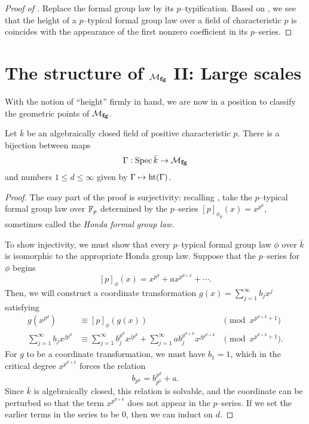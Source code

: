 \begin{proof}[{Proof of }]
Replace the formal group law by its $p$--typification.  Based on , we see that the height of a $p$--typical formal group law over a field of characteristic $p$ is coincides with the appearance of the first nonzero coefficient in its $p$--series.
\end{proof}


\section{The structure of $\mathcal{M}_{\mathbf{fg}}$ II: Large scales}

With the notion of ``height'' firmly in hand, we are now in a position to classify the geometric points of $\mathcal{M}_{\mathbf{fg}}$.

\begin{theorem}\label{FGpsOverAlgClosedFields}
Let $\bar k$ be an algebraically closed field of positive characteristic $p$.  There is a bijection between maps \[\Gamma: \operatorname{Spec} \bar k \to \mathcal{M}_{\mathbf{fg}}\] and numbers $1 \le d \le \infty$ given by $\Gamma \mapsto \operatorname{ht}(\Gamma)$. 
\end{theorem}
\begin{proof}
The easy part of the proof is surjectivity: recalling , take the $p$--typical formal group law over $\mathbb F_p$ determined by the $p$--series $[p]_{\phi_d}(x) = x^{p^d}$, sometimes called the \textit{Honda formal group law}.

To show injectivity, we must show that every $p$--typical formal group law $\phi$ over $\bar k$ is isomorphic to the appropriate Honda group law.  Suppose that the $p$--series for $\phi$ begins \[[p]_\phi(x) = x^{p^d} + a x^{p^{d+k}} + \cdots. \]  Then, we will construct a coordinate transformation $g(x) = \sum_{j=1}^\infty b_j x^j$ satisfying
\begin{align*}
g(x^{p^d}) & \equiv [p]_\phi(g(x)) & \pmod{x^{p^{d+k} + 1}} \\
\sum_{j=1}^\infty b_j x^{jp^d} & \equiv \sum_{j=1}^\infty b_j^{p^d} x^{jp^d} + \sum_{j=1}^\infty a b_j^{p^{d+k}} x^{jp^{d+k}} & \pmod{x^{p^{d+k} + 1}}.
\end{align*}
For $g$ to be a coordinate transformation, we must have $b_1 = 1$, which in the critical degree $x^{p^{d+k}}$ forces the relation \[b_{p^k} = b_{p^k}^{p^d} + a.\]  Since $\bar k$ is algebraically closed, this relation is solvable, and the coordinate can be perturbed so that the term $x^{p^{d+k}}$ does not appear in the $p$--series.  If we set the earlier terms in the series to be $0$, then we can induct on $d$.
\end{proof}

